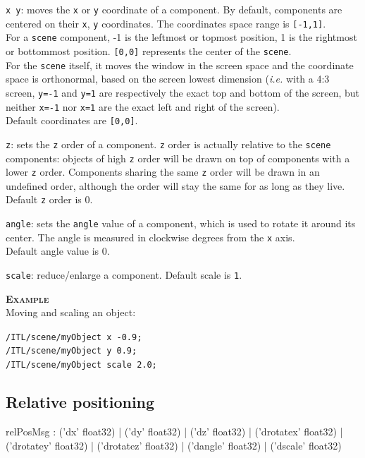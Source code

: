 \documentclass[a4paper,twoside]{report}
\newcommand{\subsublevel}[1]	{\subsection{#1}}
\newcommand{\OSC}[1]		{\texttt{#1}}
\newcommand{\values}[1]		{\texttt{#1}}
\newcommand{\example}		{\textbf{\hspace{-1.5cm}\textbf{\textsc{Example }}}}
\let\olditemize\itemize
\let\oldenditemize\enditemize
\renewenvironment{itemize} 	{\olditemize \setlength{\itemsep}{1mm}}{\oldenditemize}
\newcommand{\sample}	[1]			{\vspace{-2mm}\begin{center}\colorbox{mygrey}{
								\begin{minipage}[t]{0.9\columnwidth} 
								{\small \texttt{#1}}
								\end{minipage}}\end{center}}
\begin{document}
\begin{itemize}
\item \OSC{x y}: moves the \values{x} or \values{y} coordinate of a component. By default, components are centered on their \values{x}, \values{y} coordinates. The coordinates space range is \values{[-1,1]}. \\
For a \OSC{scene} component, -1 is the leftmost or topmost position, 1 is the rightmost or bottommost position. \values{[0,0]} represents the center of the \OSC{scene}. \\
For the \OSC{scene} itself, it moves the window in the screen space and the coordinate space is orthonormal, based on the screen lowest dimension (\emph{i.e.} with a 4:3 screen, \OSC{y=-1} and \OSC{y=1} are respectively the exact top and bottom of the screen, but neither \OSC{x=-1} nor \OSC{x=1} are the exact left and right of the screen). \\
Default coordinates are \values{[0,0]}.
\item \OSC{z}: sets the \values{z} order of a component. \values{z} order is actually relative to the \OSC{scene} components: objects of high \values{z} order will be drawn on top of components with a lower \values{z} order. Components sharing the same \values{z} order will be drawn in an undefined order, although the order will stay the same for as long as they live. \\
Default \values{z} order is 0.
\item \OSC{angle}: sets the \values{angle} value of a component, which is used to rotate it around its center. The angle is measured in clockwise degrees from the \values{x} axis.\\
Default angle value is 0.
\item \OSC{scale}: reduce/enlarge a component. Default scale is \values{1}.
\end{itemize}

\example \\
Moving and scaling an object:
\sample{/ITL/scene/myObject x -0.9; \\
/ITL/scene/myObject y 0.9; \\
/ITL/scene/myObject scale 2.0;
}

\subsublevel{Relative positioning}
\label{relpos}

\begin{rail}
relPosMsg :  
			('dx' float32)
		| 	('dy' float32)
		| 	('dz' float32)
		| 	('drotatex' float32)
		| 	('drotatey' float32)
		| 	('drotatez' float32)
		| 	('dangle' float32)
		| 	('dscale' float32) 
\end{rail}
\end{document}
